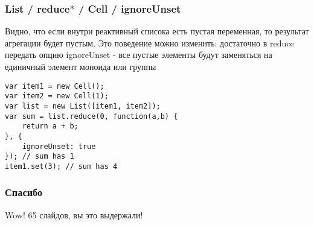 \documentclass[xetex]{beamer}
\begin{document}
\begin{frame}[fragile]
\frametitle{List / reduce$\ast$ / Cell / ignoreUnset}
Видно, что если внутри реактивный списока есть пустая переменная, то результат агрегации будет пустым. Это поведение можно изменить:  достаточно в reduce передать опцию ignoreUnset - все пустые элементы будут заменяться на единичный элемент моноида или группы
\begin{lstlisting}[frame=none]
var item1 = new Cell();
var item2 = new Cell(1);
var list = new List([item1, item2]);
var sum = list.reduce(0, function(a,b) { 
    return a + b; 
}, {
    ignoreUnset: true
}); // sum has 1 
item1.set(3); // sum has 4
\end{lstlisting}
\end{frame}


\begin{frame}[fragile]
\frametitle{Спасибо}

{\fontsize{20}{20}\selectfont Wow! 65 слайдов, вы это выдержали!}

\end{frame}
\end{document}
